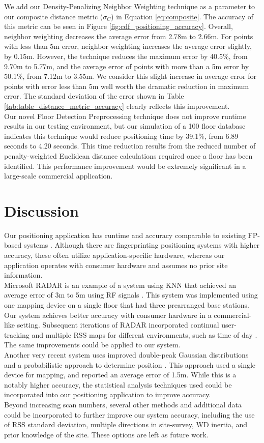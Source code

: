 \documentclass[conference]{IEEEtran}
\begin{document}
We add our Density-Penalizing Neighbor Weighting technique as a parameter to our composite distance metric ($\sigma_C$) in Equation \ref{eq:composite}. The accuracy of this metric can be seen in Figure \ref{fig:cdf_positioning_accuracy}. Overall, neighbor weighting decreases the average error from 2.78m to 2.66m. For points with less than 5m error, neighbor weighting increases the average error slightly, by 0.15m. However, the technique reduces the maximum error by 40.5\%, from 9.70m to 5.77m, and the average error of points with more than a 5m error by 50.1\%, from 7.12m to 3.55m. We consider this slight increase in average error for points with error less than 5m well worth the dramatic reduction in maximum error. The standard deviation of the error shown in Table \ref{tab:table_distance_metric_accuracy} clearly reflects this improvement.\\	
\indent Our novel Floor Detection Preprocessing technique does not improve runtime results in our testing environment, but our simulation of a 100 floor database indicates this technique would reduce positioning time by 39.1\%, from 6.89 seconds to 4.20 seconds. This time reduction results from the reduced number of penalty-weighted Euclidean distance calculations required once a floor has been identified. This performance improvement would be extremely significant in a large-scale commercial application.

\section{Discussion}
\indent Our positioning application has runtime and accuracy comparable to existing FP-based systems \cite{Liu}. Although there are fingerprinting positioning systems with higher accuracy, these often utilize application-specific hardware, whereas our application operates with consumer hardware and assumes no prior site information.\\
\indent Microsoft RADAR is an example of a system using KNN that achieved an average error of 3m to 5m using RF signals \cite{Bahl}. This system was implemented using one mapping device on a single floor that had three prearranged base stations. Our system achieves better accuracy with consumer hardware in a commercial-like setting. Subsequent iterations of RADAR incorporated continual user-tracking and multiple RSS maps for different environments, such as time of day \cite{Bahl2}. The same improvements could be applied to our system.\\
\indent Another very recent system uses improved double-peak Gaussian distributions and a probabilistic approach to determine position \cite{Chen}. This approach used a single device for mapping, and reported an average error of 1.5m. While this is a notably higher accuracy, the statistical analysis techniques used could be incorporated into our positioning application to improve accuracy.\\ 
\indent Beyond increasing scan numbers, several other methods and additional data could be incorporated to further improve our system accuracy, including the use of RSS standard deviation, multiple directions in site-survey, WD inertia, and prior knowledge of the site. These options are left as future work.
\end{document}
